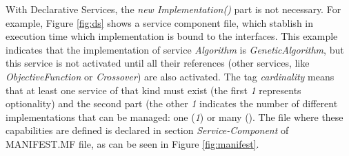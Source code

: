 \documentclass{sig-alternate}
\begin{document}
With Declarative Services, the {\em new Implementation()} part is not necessary. For example, Figure \ref{fig:ds} shows a service component file, which stablish in execution time which implementation is bound to the interfaces. This example indicates that the implementation of service {\em Algorithm} is {\em GeneticAlgorithm}, but this service is not activated until all their references (other services, like {\em ObjectiveFunction} or {\em Crossover}) are also activated. The tag {\em cardinality} means that at least one service of that kind must exist (the first {\em 1} represents optionality) and  the second part (the other {\em 1} indicates the number of different implementations that can be managed: one ({\em 1}) or many ({\em *}). The file where these capabilities are defined is declared in section {\em Service-Component} of MANIFEST.MF file, as can be seen in Figure \ref{fig:manifest}.
\end{document}
